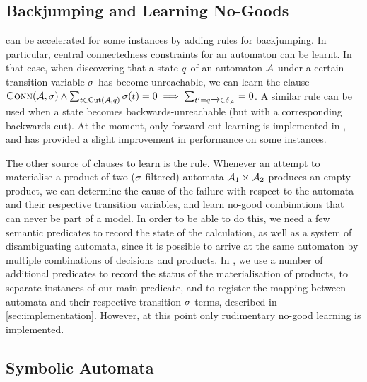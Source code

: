 \documentclass[acmsmall,review,anonymous,screen]{acmart}\settopmatter{printfolios=true,printccs=true,printacmref=true}
\theoremstyle{definition}
\begin{document}
\subsection{Backjumping and Learning No-Goods}\label{sec:ext:backjumping}

\Calculus{} can be accelerated for some instances by adding rules for
backjumping. In particular, central connectedness constraints for an automaton
can be learnt. In that case, when discovering that a state $q$ of an
automaton $\mathcal{A}$ under a certain transition variable $\operatorname{\sigma}$ has become
unreachable, we can learn the clause $\operatorname{\textsc{Conn}}(\mathcal{A}, \operatorname{\sigma}) \land
\sum_{t \in \operatorname{Cut}(\mathcal{A}, q)} \operatorname{\sigma}(t) =
0 \implies \sum_{t' = q \xrightarrow{} \in
\delta_{\mathcal{A}}} = 0$. A similar rule can be used when a state becomes
backwards-unreachable (but with a corresponding backwards cut). At the moment,
only forward-cut learning is implemented in \Catra, and has provided a slight
improvement in performance on some instances.

The other source of clauses to learn is the \Materialise{} rule. Whenever an
attempt to materialise a product of two ($\operatorname{\sigma}$-filtered) automata
$\mathcal{A}_1 \times \mathcal{A}_2$ produces an empty product, we can determine
the cause of the failure with respect to the automata and their respective
transition variables, and learn no-good combinations that can never be part of a
model. In order to be able to do this, we need a few semantic predicates to
record the state of the calculation, as well as a system of disambiguating
automata, since it is possible to arrive at the same automaton by multiple
combinations of decisions and products. In \Catra{}, we use a number of
additional predicates to record the status of the materialisation of products,
to separate instances of our main predicate, and to register the mapping between
automata and their respective transition $\operatorname{\sigma}$ terms, described in
\cref{sec:implementation}. However, at this point only rudimentary no-good
learning is implemented.

\subsection{Symbolic Automata}\label{sec:ext:symbolic}
\end{document}
